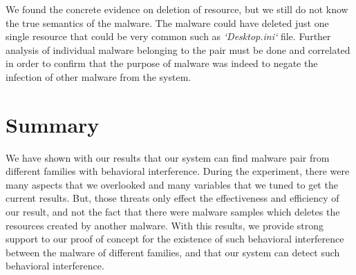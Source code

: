 We found the concrete evidence on deletion of resource, but we still do not know the true semantics of the malware.
The malware could have deleted just one single resource that could be very common such as \emph{`Desktop.ini`} file.
Further analysis of individual malware belonging to the pair must be done and correlated in order to confirm that the purpose of malware was indeed to negate the infection of other malware from the system.
\section{Summary}
\label{sec:Summary}

We have shown with our results that our system can find malware pair from different families with behavioral interference.
During the experiment, there were  many aspects that we overlooked and many variables that we tuned to get the current results.
But, those threats only effect the effectiveness and efficiency of our result, and not the fact that there were malware samples which deletes the resources created by another malware.
With this results, we provide strong support to our proof of concept for the existence of such behavioral interference between the malware of different families, and that our system can detect such behavioral interference.


